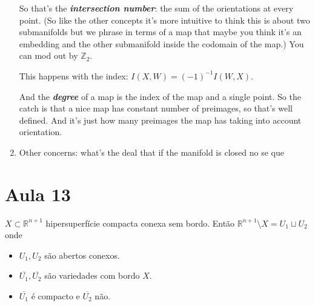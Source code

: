 \begin{enumerate}
		So that's the \textit{\textbf{intersection number}}: the sum of the orientations at every point. (So like the other concepts it's more intuitive to think this is about two submanifolds but we phrase in terms of a map that maybe you think it's an embedding and the other submanifold inside the codomain of the map.) You can mod out by \(\mathbb{Z}_2\).

		This happens with the index: \(I(X,W)=(-1)^{-1}I(W,X)\).

		And the \textit{\textbf{degree}} of a map is the index of the map and a single point. So the catch is that a nice map has constant number of preimages, so that's well defined. And it's just how many preimages the map has taking into account orientation.

	\item Other concerns: what's the deal that if the manifold is closed no se que
\end{enumerate}

\section{Aula 13}

\begin{thm}\leavevmode
	\(X \subset \mathbb{R}^{n+1}\) hipersuperfície compacta conexa sem bordo. Então \(\mathbb{R}^{n+1}\setminus X=U_1 \sqcup U_2\) onde
\begin{itemize}
\item \(U_1,U_2\) são abertos conexos.
\item \(\overline{U_1},\overline{U_2}\) são variedades com bordo \(X\).
\item \(\overline{U_1}\) é compacto e \(\overline{U_2}\) não.
\end{itemize}
\end{thm}

